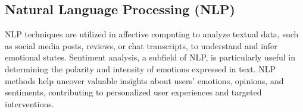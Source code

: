 \subsection{Natural Language Processing (NLP)}

NLP techniques are utilized in affective computing to analyze textual data, such as social media posts, reviews, or chat transcripts,
 to understand and infer emotional states. Sentiment analysis, a subfield of NLP, is particularly useful in determining the polarity and intensity of emotions expressed in text. 
NLP methods help uncover valuable insights about users' emotions, opinions, and sentiments, contributing to personalized user experiences and targeted interventions.